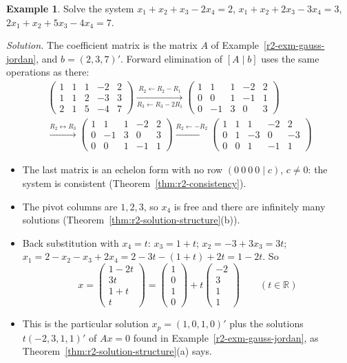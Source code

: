 \documentclass[12pt]{article}
\newcommand{\R}{\mathbb R}
\theoremstyle{definition}
\newtheorem{example}[theorem]{Example}
\begin{document}
\begin{example}\label{r2-exm-infinite}
Solve the system
\(x_1+x_2+x_3-2x_4=2\), \(x_1+x_2+2x_3-3x_4=3\), \(2x_1+x_2+5x_3-4x_4=7\).

\textit{Solution.} The coefficient matrix is the matrix \(A\) of
Example~\ref{r2-exm-gauss-jordan}, and \(b=(2,3,7)'\). Forward elimination of \([A\mid b]\)
uses the same operations as there:
\[
\begin{gathered}
\left(\begin{array}{cccc|c}1&1&1&-2&2\\1&1&2&-3&3\\2&1&5&-4&7\end{array}\right)
\xrightarrow[R_3\leftarrow R_3-2R_1]{R_2\leftarrow R_2-R_1}
\left(\begin{array}{cccc|c}1&1&1&-2&2\\0&0&1&-1&1\\0&-1&3&0&3\end{array}\right)
\\
\xrightarrow{R_2\leftrightarrow R_3}
\left(\begin{array}{cccc|c}1&1&1&-2&2\\0&-1&3&0&3\\0&0&1&-1&1\end{array}\right)
\xrightarrow{R_2\leftarrow-R_2}
\left(\begin{array}{cccc|c}1&1&1&-2&2\\0&1&-3&0&-3\\0&0&1&-1&1\end{array}\right)
\end{gathered}
\]
\begin{itemize}
\item The last matrix is an echelon form with no row \((0\ 0\ 0\ 0\mid c)\), \(c\ne0\): the
system is consistent (Theorem~\ref{thm:r2-consistency}).
\item The pivot columns are \(1,2,3\), so \(x_4\) is free and there are infinitely many
solutions (Theorem~\ref{thm:r2-solution-structure}(b)).
\item Back substitution with \(x_4=t\): \(x_3=1+t\); \(x_2=-3+3x_3=3t\);
\(x_1=2-x_2-x_3+2x_4=2-3t-(1+t)+2t=1-2t\). So
\[
x=\begin{pmatrix}1-2t\\3t\\1+t\\t\end{pmatrix}=\begin{pmatrix}1\\0\\1\\0\end{pmatrix}+t\begin{pmatrix}-2\\3\\1\\1\end{pmatrix}\qquad(t\in\R)
\]
\item This is the particular solution \(x_p=(1,0,1,0)'\) plus the solutions \(t(-2,3,1,1)'\)
of \(Ax=0\) found in Example~\ref{r2-exm-gauss-jordan}, as
Theorem~\ref{thm:r2-solution-structure}(a) says.
\end{itemize}
\end{example}
\end{document}
